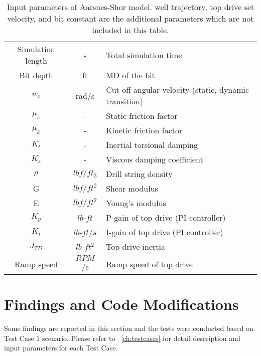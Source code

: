 \begin{table}
\centering
\begin{tabularx}{\linewidth-0.75in}{|c|c|L|}
\hline
{} &  &  \\                                                              
\hline
Simulation length & s & Total simulation time \\                                                  
\hline
Bit depth & ft & MD of the bit \\                                                   
\hline
$w_c$ & rad/s & Cut-off angular velocity (static, dynamic transition)\\                                                              
\hline
$\mu_s$ & -& Static friction factor\\
\hline
$\mu_k$ & - & Kinetic friction factor \\ 
\hline
$K_t$ &- & Inertial torsional damping \\                                                  
\hline
$K_s$ &- & Viscous damping coefficient \\                                                   
\hline
$\rho$ & $lbf/ft_3$ & Drill string density \\                                                       
\hline
G & $lbf/ft^2$ & Shear modulus   \\                                                         
\hline
E & $lbf/ft^2$ & Young's modulus \\                                                              
\hline
$K_p$ & $lb$-$ft$ & P-gain of top drive (PI controller) \\
\hline
$K_i$ & $lb$-$ft/s$ &I-gain of top drive (PI controller)\\ 
\hline
$J_{TD}$ & $lb$-$ft^2$ & Top drive inertia \\
\hline
Ramp speed & $RPM$/s & Ramp speed of top drive\\
\hline
\end{tabularx}
\caption[Input parameters of Aarsnes-Shor model (Python ver.)]{Input parameters of Aarsnes-Shor model. well trajectory, top drive set velocity, and bit constant are the additional parameters which are not included in this table.}\label{AS_inptut_params}
\end{table}

\section{Findings and Code Modifications}
Some findings are reported in this section and the tests were conducted based on Test Case 1 scenario. Please refer to \chaptername~\ref{ch:testcases} for detail description and input parameters for each Test Case.

